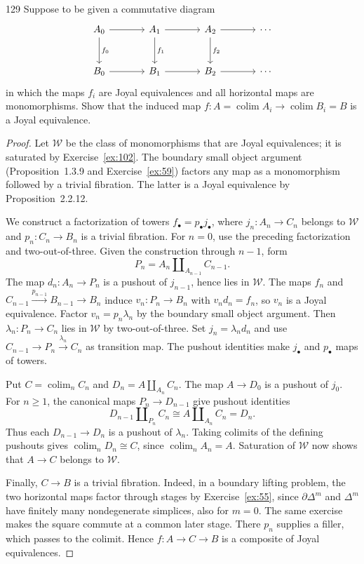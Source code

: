 \begin{exercise}{129}
Suppose to be given a commutative diagram
\[
\begin{tikzcd}[column sep=large,row sep=large]
 A_0\arrow[r]\arrow[d,"f_0"] & A_1\arrow[r]\arrow[d,"f_1"] &
 A_2\arrow[r]\arrow[d,"f_2"] & \cdots \\
 B_0\arrow[r] & B_1\arrow[r] & B_2\arrow[r] & \cdots
\end{tikzcd}
\]
in which the maps $f_i$ are Joyal equivalences and all horizontal maps are monomorphisms.
Show that the induced map $f\colon A=\operatorname{colim}A_i\to\operatorname{colim}B_i=B$ is a Joyal equivalence.

\begin{proof}
Let $\mathcal W$ be the class of monomorphisms that are Joyal equivalences;
it is saturated by Exercise~\ref{ex:102}.
The boundary small object argument (Proposition~1.3.9 and
Exercise~\ref{ex:59}) factors any map as a monomorphism followed by a
trivial fibration. The latter is a Joyal equivalence by Proposition~2.2.12.

We construct a factorization of towers $f_\bullet=p_\bullet j_\bullet$,
where $j_n\colon A_n\to C_n$ belongs to $\mathcal W$ and
$p_n\colon C_n\to B_n$ is a trivial fibration.
For $n=0$, use the preceding factorization and two-out-of-three.
Given the construction through $n-1$, form
\[
 P_n=A_n\amalg_{A_{n-1}}C_{n-1}.
\]
The map $d_n\colon A_n\to P_n$ is a pushout of $j_{n-1}$, hence lies
in $\mathcal W$. The maps $f_n$ and
$C_{n-1}\xrightarrow{p_{n-1}}B_{n-1}\to B_n$ induce
$v_n\colon P_n\to B_n$ with $v_nd_n=f_n$, so $v_n$ is a Joyal equivalence.
Factor $v_n=p_n\lambda_n$ by the boundary small object argument.
Then $\lambda_n\colon P_n\to C_n$ lies in $\mathcal W$ by two-out-of-three.
Set $j_n=\lambda_nd_n$ and use
$C_{n-1}\to P_n\xrightarrow{\lambda_n}C_n$ as transition map.
The pushout identities make $j_\bullet$ and $p_\bullet$ maps of towers.

Put $C=\operatorname{colim}_nC_n$ and $D_n=A\amalg_{A_n}C_n$.
The map $A\to D_0$ is a pushout of $j_0$.
For $n\ge1$, the canonical maps $P_n\to D_{n-1}$ give pushout identities
\[
 D_{n-1}\amalg_{P_n}C_n\cong A\amalg_{A_n}C_n=D_n.
\]
Thus each $D_{n-1}\to D_n$ is a pushout of $\lambda_n$.
Taking colimits of the defining pushouts gives
$\operatorname{colim}_nD_n\cong C$, since $\operatorname{colim}_nA_n=A$.
Saturation of $\mathcal W$ now shows that $A\to C$ belongs to $\mathcal W$.

Finally, $C\to B$ is a trivial fibration.
Indeed, in a boundary lifting problem, the two horizontal maps factor
through stages by Exercise~\ref{ex:55}, since $\partial\Delta^m$ and
$\Delta^m$ have finitely many nondegenerate simplices, also for $m=0$.
The same exercise makes the square commute at a common later stage.
There $p_n$ supplies a filler, which passes to the colimit.
Hence $f\colon A\to C\to B$ is a composite of Joyal equivalences.
\end{proof}
\end{exercise}
